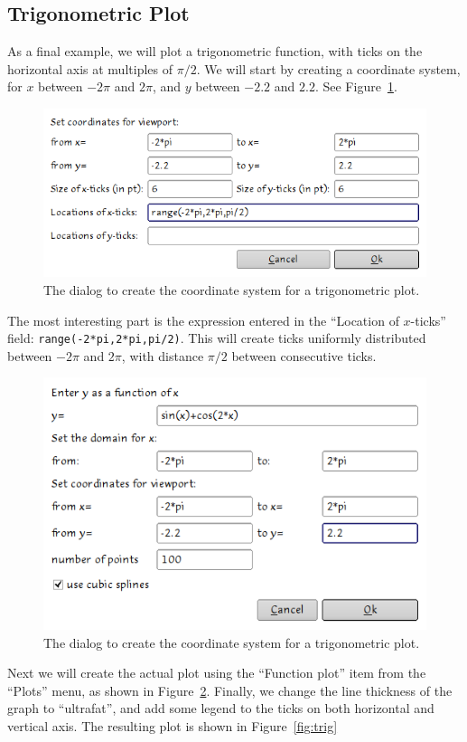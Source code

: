 \documentclass{article}
\begin{document}
\subsection{Trigonometric Plot}
As a final example, we will plot a trigonometric function, with ticks on the
horizontal axis at multiples of $\pi/2$. We will start by creating a coordinate
system, for $x$ between $-2\pi$ and $2\pi$, and $y$ between $-2.2$ and $2.2$.
See Figure~\ref{fig:trig_coords}.  
\begin{figure}[h]
   \begin{center}
      \includegraphics[scale=.5]{trig_coords.png}
   \end{center}
   \caption{The dialog to create the coordinate system for a trigonometric
   plot.}
   \label{fig:trig_coords}
\end{figure}
The most interesting part is the expression entered in the ``Location of
$x$-ticks'' field: \texttt{range(-2*pi,2*pi,pi/2)}. This will create ticks
uniformly distributed between $-2\pi$ and $2\pi$, with distance $\pi/2$ between
consecutive ticks.  

\begin{figure}[h]
   \begin{center}
      \includegraphics[scale=.5]{trig_dialog.png}
   \end{center}
   \caption{The dialog to create the coordinate system for a trigonometric
   plot.}
   \label{fig:trig_dialog}
\end{figure}
Next we will create the actual plot using the ``Function plot'' item from the
``Plots'' menu, as shown in Figure~\ref{fig:trig_dialog}. Finally, we change
the line thickness of the graph to ``ultrafat'', and add some legend to the
ticks on both horizontal and vertical axis. The resulting plot is shown in
Figure~\ref{fig:trig}
\end{document}
